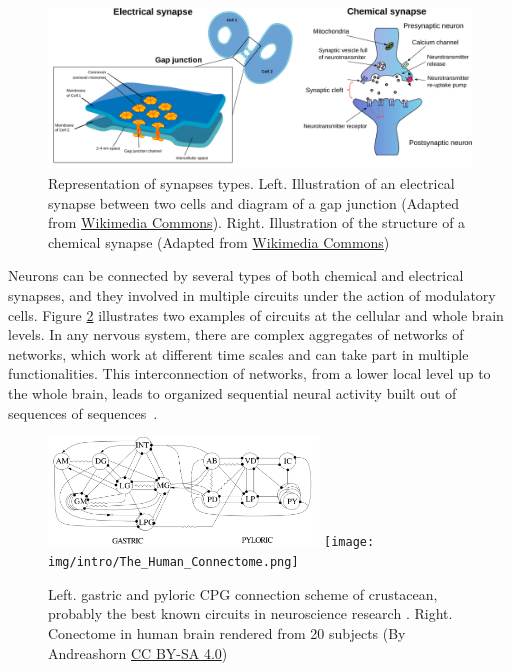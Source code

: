 \begin{figure}[hbt!]
    \centering
    \includegraphics[width=\linewidth]{img/intro/synapses.pdf}
    \caption{Representation of synapses types. Left. Illustration of an electrical synapse between two cells and diagram of a gap junction (Adapted from \href{https://commons.wikimedia.org/wiki/File:Gap_cell_junction-en.svg}{Wikimedia Commons}). Right. Illustration of the structure of a chemical synapse (Adapted from \href{https://commons.wikimedia.org/wiki/File:Synapse_diag1.svg}{Wikimedia Commons})}
    \label{fig:synapse-types}
\end{figure}

Neurons can be connected by several types of both chemical and electrical synapses, and they involved in multiple circuits under the action of modulatory cells. Figure \ref{fig:neural circuits} illustrates two examples of circuits at the cellular and whole brain levels. In any nervous system, there are complex aggregates of networks of networks, which work at different time scales and can take part in multiple functionalities. This interconnection of networks, from a lower local level up to the whole brain, leads to organized sequential neural activity built out of sequences of sequences~\parencite{rabinovich_sequential_2020}.


\begin{figure}[hbt!]
    \centering
    \includegraphics[width=0.64\textwidth]{img/intro/cpg diagram.png}
    \texttt{[image: img/intro/The\_Human\_Connectome.png]}
    \caption{Left. gastric and pyloric CPG connection scheme of crustacean, probably the best known circuits in neuroscience research \parencite{huerta_topology_2001}. Right. Conectome in human brain rendered from 20 subjects (By Andreashorn \href{https://commons.wikimedia.org/w/index.php?curid=41581320}{CC BY-SA 4.0})}
    \label{fig:neural circuits}
\end{figure}

